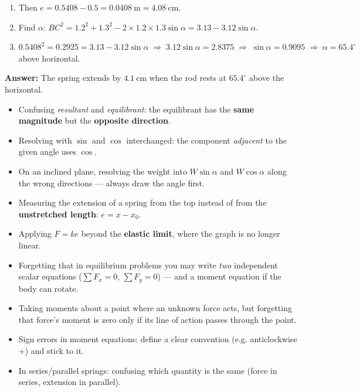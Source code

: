 \documentclass[11pt]{article}
\begin{document}
\begin{exoresolu}
\begin{enumerate}
\item Then $e = 0.5408 - 0.5 = 0.0408\ \mathrm{m} = 4.08\ \mathrm{cm}$.
\item Find $\alpha$: $BC^2 = 1.2^2 + 1.3^2 - 2\times1.2\times1.3\sin\alpha = 3.13 - 3.12\sin\alpha$.
\item $0.5408^2 = 0.2925 = 3.13 - 3.12\sin\alpha \;\Longrightarrow\; 3.12\sin\alpha = 2.8375 \;\Longrightarrow\; \sin\alpha = 0.9095 \;\Longrightarrow\; \alpha = 65.4^{\circ}$ above horizontal.
\end{enumerate}
\textbf{Answer:} The spring extends by $4.1\ \mathrm{cm}$ when the rod rests at $65.4^{\circ}$ above the horizontal.
\end{exoresolu}

\begin{attention}
\begin{itemize}
\item Confusing \emph{resultant} and \emph{equilibrant}: the equilibrant has the \textbf{same magnitude} but the \textbf{opposite direction}.
\item Resolving with $\sin$ and $\cos$ interchanged: the component \emph{adjacent} to the given angle uses $\cos$.
\item On an inclined plane, resolving the weight into $W\sin\alpha$ and $W\cos\alpha$ along the wrong directions — always draw the angle first.
\item Measuring the extension of a spring from the top instead of from the \textbf{unstretched length}: $e=x-x_0$.
\item Applying $F=ke$ beyond the \textbf{elastic limit}, where the graph is no longer linear.
\item Forgetting that in equilibrium problems you may write \emph{two} independent scalar equations ($\sum F_x=0$, $\sum F_y=0$) — and a moment equation if the body can rotate.
\item Taking moments about a point where an unknown force acts, but forgetting that force's moment is zero only if its line of action passes through the point.
\item Sign errors in moment equations: define a clear convention (e.g. anticlockwise +) and stick to it.
\item In series/parallel springs: confusing which quantity is the same (force in series, extension in parallel).
\end{itemize}
\end{attention}
\end{document}
